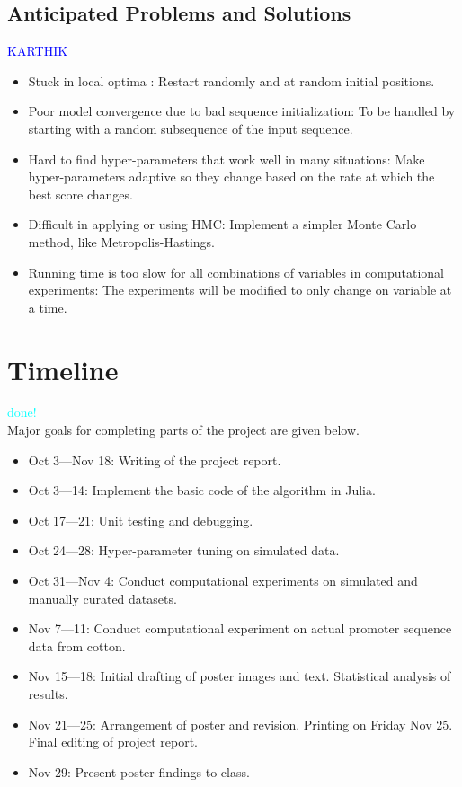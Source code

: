 \documentclass{article}
\begin{document}
\subsection{Anticipated Problems and Solutions}
\textcolor{blue}{KARTHIK} \\
\begin{itemize}
    \item Stuck in local optima : Restart randomly and at random initial positions.
	\item Poor model convergence due to bad sequence initialization: To be handled by starting with a random subsequence of the input sequence.
	\item Hard to find hyper-parameters that work well in many situations: Make hyper-parameters adaptive so they change based on the rate at which the best score changes.
	\item Difficult in applying or using HMC: Implement a simpler Monte Carlo method, like Metropolis-Hastings.
	\item Running time is too slow for all combinations of variables in computational experiments: The experiments will be modified to only change on variable at a time.
\end{itemize}
\section{Timeline}
\textcolor{cyan}{done!} \\
Major goals for completing parts of the project are given below. 
\begin{itemize}
	\item Oct  3---Nov 18: Writing of the project report.
	\item Oct  3---14: Implement the basic code of the algorithm in Julia.
	\item Oct 17---21: Unit testing and debugging.
	\item Oct 24---28: Hyper-parameter tuning on simulated data.
	\item Oct 31---Nov 4: Conduct computational experiments on simulated and manually curated datasets.
	\item Nov 7---11: Conduct computational experiment on actual promoter sequence data from cotton.
	\item Nov 15---18: Initial drafting of poster images and text. Statistical analysis of results.
	\item Nov 21---25: Arrangement of poster and revision. Printing on Friday Nov 25. Final editing of project report.
	\item Nov 29: Present poster findings to class.
\end{itemize}
\pagebreak
\end{document}
